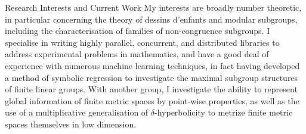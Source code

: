 \begin{rSection}{Research Interests and Current Work}
My interests are broadly number theoretic, in particular concerning the theory of dessins d'enfants and modular subgroups, including the characterisation of families of non-congruence subgroups. I specialise in writing highly parallel, concurrent, and distributed libraries to address experimental problems in mathematics, and have a good deal of experience with numerous machine learning techniques, in fact having developed a method of symbolic regression to investigate the maximal subgroup structures of finite linear groups. With another group, I investigate the ability to represent global information of finite metric spaces by point-wise properties, as well as the use of a multiplicative generalisation of $\delta$-hyperbolicity to metrize finite metric spaces themselves in low dimension.









\end{rSection}
